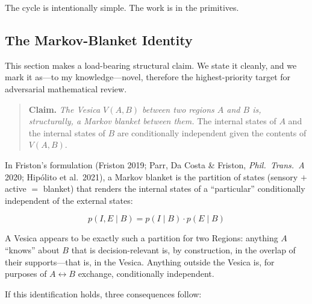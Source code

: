 \documentclass[11pt,a4paper]{article}
\begin{document}
The cycle is intentionally simple. The work is in the primitives.

\subsection{The Markov-Blanket Identity}

This section makes a load-bearing structural claim. We state it cleanly, and we mark it as---to my knowledge---novel, therefore the highest-priority target for adversarial mathematical review.

\begin{quote}
\textbf{Claim.} \emph{The Vesica $V(A, B)$ between two regions $A$ and $B$ is, structurally, a Markov blanket between them.} The internal states of $A$ and the internal states of $B$ are conditionally independent given the contents of $V(A, B)$.
\end{quote}

In Friston's formulation (Friston 2019; Parr, Da Costa \& Friston, \emph{Phil.\ Trans.\ A} 2020; Hip\'olito et al.\ 2021), a Markov blanket is the partition of states (sensory $+$ active $=$ blanket) that renders the internal states of a ``particular'' conditionally independent of the external states:

\[ p(I, E \mid B) = p(I \mid B) \cdot p(E \mid B) \]

A Vesica appears to be exactly such a partition for two Regions: anything $A$ ``knows'' about $B$ that is decision-relevant is, by construction, in the overlap of their supports---that is, in the Vesica. Anything outside the Vesica is, for purposes of $A \leftrightarrow B$ exchange, conditionally independent.

If this identification holds, three consequences follow:
\end{document}
